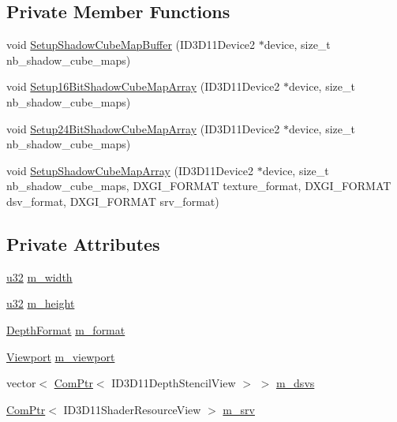 \subsection*{Private Member Functions}
\begin{DoxyCompactItemize}
\item 
void \hyperlink{structmage_1_1_shadow_cube_map_buffer_acbdfc3eaf61ba5b4638033b804f90e86}{Setup\+Shadow\+Cube\+Map\+Buffer} (I\+D3\+D11\+Device2 $\ast$device, size\+\_\+t nb\+\_\+shadow\+\_\+cube\+\_\+maps)
\item 
void \hyperlink{structmage_1_1_shadow_cube_map_buffer_a9b9f6219dd2d3fac58e9930d5c4aed89}{Setup16\+Bit\+Shadow\+Cube\+Map\+Array} (I\+D3\+D11\+Device2 $\ast$device, size\+\_\+t nb\+\_\+shadow\+\_\+cube\+\_\+maps)
\item 
void \hyperlink{structmage_1_1_shadow_cube_map_buffer_ab1c660841a9dc2db1fcd3aba6456b400}{Setup24\+Bit\+Shadow\+Cube\+Map\+Array} (I\+D3\+D11\+Device2 $\ast$device, size\+\_\+t nb\+\_\+shadow\+\_\+cube\+\_\+maps)
\item 
void \hyperlink{structmage_1_1_shadow_cube_map_buffer_a583020f593e4a02f6eda0103f56042bd}{Setup\+Shadow\+Cube\+Map\+Array} (I\+D3\+D11\+Device2 $\ast$device, size\+\_\+t nb\+\_\+shadow\+\_\+cube\+\_\+maps, D\+X\+G\+I\+\_\+\+F\+O\+R\+M\+AT texture\+\_\+format, D\+X\+G\+I\+\_\+\+F\+O\+R\+M\+AT dsv\+\_\+format, D\+X\+G\+I\+\_\+\+F\+O\+R\+M\+AT srv\+\_\+format)
\end{DoxyCompactItemize}
\subsection*{Private Attributes}
\begin{DoxyCompactItemize}
\item 
\hyperlink{namespacemage_af2b398bf98eb10351f49cad73fe2cc73}{u32} \hyperlink{structmage_1_1_shadow_cube_map_buffer_aae5099d50ae311379f32508ae9c81a33}{m\+\_\+width}
\item 
\hyperlink{namespacemage_af2b398bf98eb10351f49cad73fe2cc73}{u32} \hyperlink{structmage_1_1_shadow_cube_map_buffer_a1483378ffc1ebaf9b92eb4d7d7a951e1}{m\+\_\+height}
\item 
\hyperlink{namespacemage_aed4c3f883a30484d0a20762c06be81d4}{Depth\+Format} \hyperlink{structmage_1_1_shadow_cube_map_buffer_ada9a7c895a74303904f9884b986c935f}{m\+\_\+format}
\item 
\hyperlink{structmage_1_1_viewport}{Viewport} \hyperlink{structmage_1_1_shadow_cube_map_buffer_aac92648e1af47ffdf99575cdaab0485e}{m\+\_\+viewport}
\item 
vector$<$ \hyperlink{namespacemage_ae74f374780900893caa5555d1031fd79}{Com\+Ptr}$<$ I\+D3\+D11\+Depth\+Stencil\+View $>$ $>$ \hyperlink{structmage_1_1_shadow_cube_map_buffer_aa0db6bec24d63c39c85400c4328190fc}{m\+\_\+dsvs}
\item 
\hyperlink{namespacemage_ae74f374780900893caa5555d1031fd79}{Com\+Ptr}$<$ I\+D3\+D11\+Shader\+Resource\+View $>$ \hyperlink{structmage_1_1_shadow_cube_map_buffer_a16738a534aca6de39aec687bc79ede1c}{m\+\_\+srv}
\end{DoxyCompactItemize}


